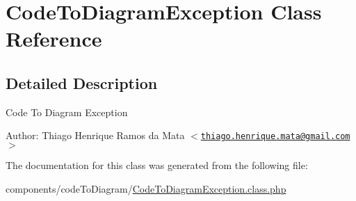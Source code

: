 \hypertarget{class_code_to_diagram_exception}{
\section{CodeToDiagramException Class Reference}
\label{class_code_to_diagram_exception}
}


\subsection{Detailed Description}
Code To Diagram Exception

\begin{Desc}
\item[Author:]Thiago Henrique Ramos da Mata $<$\href{mailto:thiago.henrique.mata@gmail.com}{\tt thiago.henrique.mata@gmail.com}$>$ \end{Desc}


The documentation for this class was generated from the following file:\begin{CompactItemize}
\item 
components/codeToDiagram/\hyperlink{_code_to_diagram_exception_8class_8php}{CodeToDiagramException.class.php}\end{CompactItemize}
